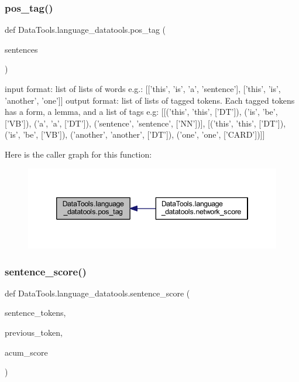 \subsubsection{\texorpdfstring{pos\+\_\+tag()}{pos\_tag()}}
{\footnotesize\ttfamily def Data\+Tools.\+language\+\_\+datatools.\+pos\+\_\+tag (\begin{DoxyParamCaption}\item[{}]{sentences }\end{DoxyParamCaption})}

\begin{DoxyVerb}input format: list of lists of words
    e.g.: [['this', 'is', 'a', 'sentence'], ['this', 'is', 'another', 'one']]
output format: list of lists of tagged tokens. Each tagged tokens has a
form, a lemma, and a list of tags
    e.g: [[('this', 'this', ['DT']), ('is', 'be', ['VB']), ('a', 'a', ['DT']), ('sentence', 'sentence', ['NN'])],
            [('this', 'this', ['DT']), ('is', 'be', ['VB']), ('another', 'another', ['DT']),
            ('one', 'one', ['CARD'])]]
\end{DoxyVerb}
 Here is the caller graph for this function\+:
\nopagebreak
\begin{figure}[H]
\begin{center}
\leavevmode
\includegraphics[width=346pt]{namespace_data_tools_1_1language__datatools_a32400bed4e58a49b11ac2d4e6a2e5462_icgraph}
\end{center}
\end{figure}
\mbox{\label{namespace_data_tools_1_1language__datatools_abe2e77093c7288b7daf9baa62399f77b}} 
\subsubsection{\texorpdfstring{sentence\+\_\+score()}{sentence\_score()}}
{\footnotesize\ttfamily def Data\+Tools.\+language\+\_\+datatools.\+sentence\+\_\+score (\begin{DoxyParamCaption}\item[{}]{sentence\+\_\+tokens,  }\item[{}]{previous\+\_\+token,  }\item[{}]{acum\+\_\+score }\end{DoxyParamCaption})}

